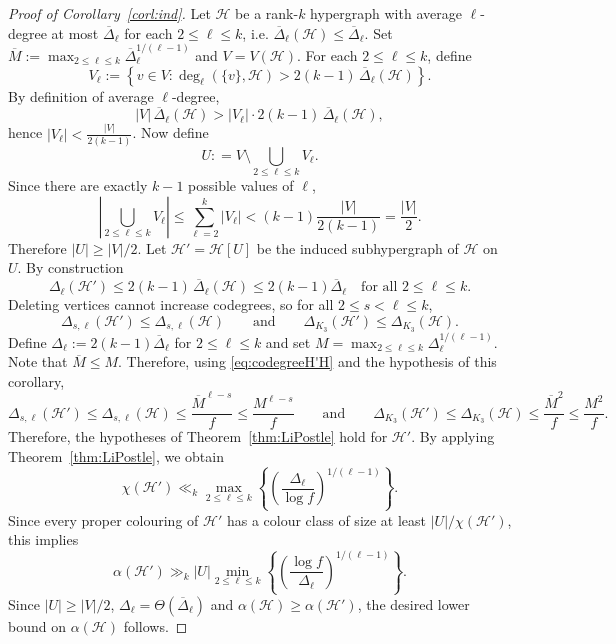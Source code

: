 \documentclass[11pt,oneside]{amsart}
\numberwithin{exercise}{subsection}
\begin{document}
\begin{proof}[Proof of Corollary~\ref{corl:ind}]
 Let $\mathcal{H}$ be a rank-$k$ hypergraph with average $\ell$-degree at most $\overline{\Delta}_\ell$ for each $2\leq \ell \leq k$, i.e. $\overline\Delta_\ell(\mathcal{H})\leq \overline{\Delta}_\ell$.  Set $\overline{M}:=\max_{2 \leq \ell \leq k}
\overline{\Delta}_\ell^{1/(\ell - 1)}$ and $V = V(\mathcal{H})$. 
For each $2 \le \ell \le k$, define
\[
V_\ell:=\left\{v \in V :\deg_\ell(\{v\}, \mathcal{H})>2(k-1)\, \overline{\Delta}_\ell(\mathcal{H})
\right\}.\]
By definition of average $\ell$-degree,
\[
|V|\, \overline{\Delta}_\ell(\mathcal{H})
>|V_\ell| \cdot 2(k-1)\,\overline{\Delta}_\ell(\mathcal{H}),\]
hence $|V_\ell| < \frac{|V|}{2(k-1)}$.
Now define
\[
U:
=
V
\setminus
\bigcup_{2 \le \ell \le k} V_\ell.
\]
Since there are exactly $k-1$ possible values of $\ell$,
\[
\left|
\bigcup_{2 \le \ell \le k} V_\ell
\right|\leq \sum_{\ell=2}^k|V_\ell|
<
(k-1)\frac{|V|}{2(k-1)}
=
\frac{|V|}{2}.
\]
Therefore $|U| \ge |V|/2$. Let $\mathcal{H}'=\mathcal{H}[U]$ be the induced subhypergraph of $\mathcal{H}$ on $U$. By construction $$\Delta_\ell(\mathcal{H}')
\le
2(k-1)\,\overline{\Delta}_\ell(\mathcal{H})\leq 2(k-1)\overline{\Delta}_\ell
\quad
\text{for all } 2 \le \ell \le k.$$
Deleting vertices cannot increase codegrees, so for all 
$2 \le s < \ell \le k$,
\begin{equation}
\label{eq:codegreeH'H}
\Delta_{s,\ell}(\mathcal{H}')
\le
\Delta_{s,\ell}(\mathcal{H})
\qquad \text{and} \qquad 
\Delta_{K_3}(\mathcal{H}')
\le
\Delta_{K_3}(\mathcal{H}).
\end{equation}
Define $\Delta_\ell:=2(k-1)\overline{\Delta}_\ell$ for $2\leq \ell \leq k$ and set $M=\max_{2 \leq \ell \leq k}\Delta_\ell^{1/(\ell-1)}$. Note that $\overline{M}\leq M$.
Therefore, using \eqref{eq:codegreeH'H} and the hypothesis of this corollary,
\begin{equation*}
\Delta_{s,\ell}(\mathcal{H}')\leq 
\Delta_{s,\ell}(\mathcal{H})
\le
\frac{\overline{M}^{\ell-s}}{f}\leq \frac{M^{\ell-s}}{f} 
\qquad \text{and} \qquad \Delta_{K_3}(\mathcal{H}')
\leq 
\Delta_{K_3}(\mathcal{H})
\le
\frac{\overline{M}^2}{f}\leq \frac{M^2}{f}.
\end{equation*}
Therefore, the hypotheses of Theorem~\ref{thm:LiPostle} hold for $\mathcal{H}'$. By applying Theorem~\ref{thm:LiPostle}, we obtain
\[
\chi(\mathcal{H}')
\ll_k
\max_{2 \le \ell \le k}
\left\{
\left(
\frac{\Delta_\ell}{\log f}
\right)^{1/(\ell - 1)}
\right\}.
\]
Since every proper colouring of \(\mathcal H'\) has a colour class of size at least
\(|U|/\chi(\mathcal H')\), this implies
\[
\alpha(\mathcal{H}')
\gg_k
|U|
\min_{2 \le \ell \le k}
\left\{
\left(
\frac{\log f}{\Delta_\ell}
\right)^{1/(\ell - 1)}
\right\}
.
\]
Since $|U| \ge |V|/2$, $\Delta_\ell=\Theta(\overline{\Delta}_\ell)$ and $\alpha(\mathcal{H}) \ge \alpha(\mathcal{H}')$,
the desired lower bound on $\alpha(\mathcal{H})$ follows.
\end{proof}
\end{document}
